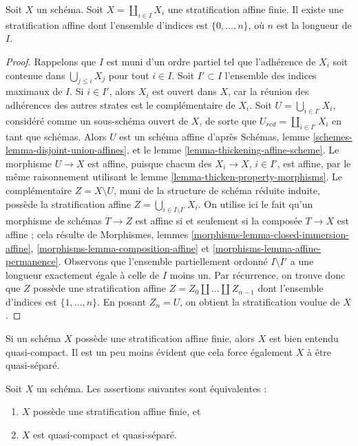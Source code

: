 \begin{lemma}
\label{lemma-improve-stratification}
Soit $X$ un schéma. Soit $X = \coprod_{i \in I} X_i$ une stratification
affine finie. Il existe une stratification affine
dont l'ensemble d'indices est $\{0, \ldots, n\}$, où $n$ est la longueur de $I$.
\end{lemma}

\begin{proof}
Rappelons que $I$ est muni d'un ordre partiel tel que
l'adhérence de $X_i$ soit contenue dans $\bigcup_{j \leq i} X_j$
pour tout $i \in I$.
Soit $I' \subset I$ l'ensemble des indices maximaux de $I$.
Si $i \in I'$, alors $X_i$ est ouvert dans $X$, car la réunion des
adhérences des autres strates est le complémentaire de $X_i$.
Soit $U = \bigcup_{i \in I'} X_i$, considéré comme un sous-schéma ouvert de $X$,
de sorte que $U_{red} = \coprod_{i \in I'} X_i$ en tant que schémas.
Alors $U$ est un schéma affine d'après
Schémas, lemme \ref{schemes-lemma-disjoint-union-affines},
et le lemme \ref{lemma-thickening-affine-scheme}. Le morphisme $U \to X$
est affine, puisque chacun des $X_i \to X$, $i \in I'$, est affine, par le même raisonnement
utilisant le lemme \ref{lemma-thicken-property-morphisms}.
Le complémentaire $Z = X \setminus U$, muni de la
structure de schéma réduite induite, possède la stratification
affine $Z = \bigcup_{i \in I \setminus I'} X_i$.
On utilise ici le fait qu'un morphisme de schémas $T \to Z$ est affine
si et seulement si la composée $T \to X$ est affine ; cela résulte
de Morphismes, lemmes \ref{morphisms-lemma-closed-immersion-affine},
\ref{morphisms-lemma-composition-affine} et
\ref{morphisms-lemma-affine-permanence}.
Observons que l'ensemble partiellement ordonné $I \setminus I'$
a une longueur exactement égale à celle de $I$ moins un.
Par récurrence, on trouve donc que $Z$ possède une stratification
affine $Z = Z_0 \amalg \ldots \amalg Z_{n - 1}$
dont l'ensemble d'indices est $\{1, \ldots, n\}$. En posant $Z_n = U$,
on obtient la stratification voulue de $X$.
\end{proof}

\noindent
Si un schéma $X$ possède une stratification affine finie, alors
$X$ est bien entendu quasi-compact. Il est un peu moins évident que
cela force également $X$ à être quasi-séparé.

\begin{lemma}
\label{lemma-qc-affine-stratification}
Soit $X$ un schéma. Les assertions suivantes sont équivalentes :
\begin{enumerate}
\item $X$ possède une stratification affine finie, et
\item $X$ est quasi-compact et quasi-séparé.
\end{enumerate}
\end{lemma}

